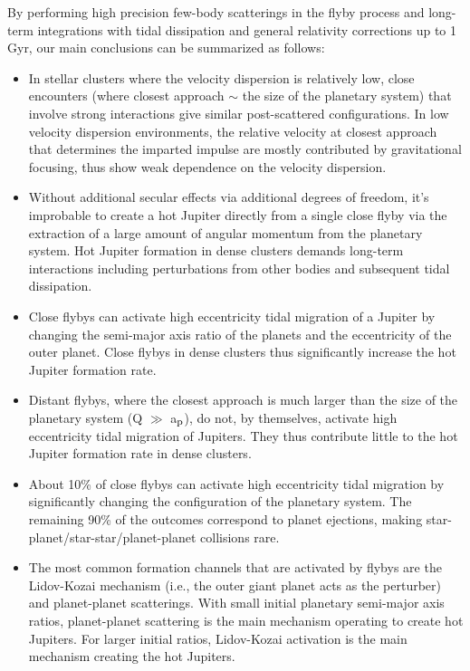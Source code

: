 \documentclass[twocolumn]{aastex63}
\begin{document}
By performing high precision few-body scatterings in the flyby process and long-term integrations with tidal dissipation and general relativity corrections up to 1 Gyr, our main conclusions can be summarized as follows:

\begin{itemize}
    \item In stellar clusters where the velocity dispersion is relatively low, close encounters (where closest approach $\sim$ the size of the planetary system) that involve strong interactions give similar post-scattered configurations. In low velocity dispersion environments, the relative velocity at closest approach that determines the imparted impulse are mostly contributed by gravitational focusing, thus show weak dependence on the velocity dispersion.
    
    \item Without additional secular effects via additional degrees of freedom, it's improbable to create a hot Jupiter directly from a single close flyby via the extraction of a large amount of angular momentum from the planetary system. Hot Jupiter formation in dense clusters demands long-term interactions including perturbations from other bodies and subsequent tidal dissipation.
    
    \item Close flybys can activate high eccentricity tidal migration of a Jupiter by changing the semi-major axis ratio of the planets and the eccentricity of the outer planet. Close flybys in dense clusters thus significantly increase the hot Jupiter formation rate.
    
    \item Distant flybys, where the closest approach is much larger than the size of the planetary system (Q $\gg$ a$_{\rm p}$), do not, by themselves, activate high eccentricity tidal migration of Jupiters. They thus contribute little to the hot Jupiter formation rate in dense clusters.
    
    \item About 10\% of close flybys can activate high eccentricity tidal migration by significantly changing the configuration of the planetary system. The remaining 90\% of the outcomes correspond to planet ejections, making star-planet/star-star/planet-planet collisions rare.
    
    \item The most common formation channels that are activated by flybys are the Lidov-Kozai mechanism (i.e., the outer giant planet acts as the perturber) and planet-planet scatterings. With small initial planetary semi-major axis ratios, planet-planet scattering is the main mechanism operating to create hot Jupiters.  For larger initial ratios,  Lidov-Kozai activation is the main mechanism creating the hot Jupiters.
    

\end{itemize}
\end{document}
